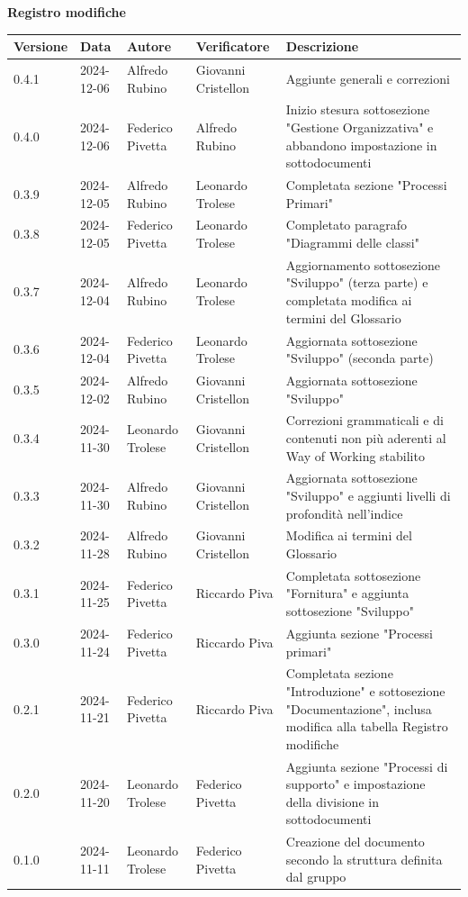 \documentclass[10pt]{article}
\begin{document}
\begin{center}
\textbf{Registro modifiche}\\
\vspace{2mm}

\begin{tabularx}{\textwidth}{|l|l|l|l|X|}
\hline
\textbf{Versione} & \textbf{Data} & \textbf{Autore} & \textbf{Verificatore} & \textbf{Descrizione}\\
    \hline
    0.4.1 & 2024-12-06 & Alfredo Rubino & Giovanni Cristellon & Aggiunte generali e correzioni\\
    \hline
    0.4.0 & 2024-12-06 & Federico Pivetta & Alfredo Rubino & Inizio stesura sottosezione "Gestione Organizzativa" e abbandono impostazione in sottodocumenti\\
    \hline
    0.3.9 & 2024-12-05 & Alfredo Rubino & Leonardo Trolese & Completata sezione "Processi Primari"\\
    \hline
    0.3.8 & 2024-12-05 & Federico Pivetta & Leonardo Trolese & Completato paragrafo "Diagrammi delle classi"\\
    \hline
    0.3.7 & 2024-12-04 & Alfredo Rubino & Leonardo Trolese & Aggiornamento sottosezione "Sviluppo" (terza parte) e completata modifica ai termini del Glossario\\
    \hline
    0.3.6 & 2024-12-04 & Federico Pivetta & Leonardo Trolese & Aggiornata sottosezione "Sviluppo" (seconda parte)\\
    \hline
    0.3.5 & 2024-12-02 & Alfredo Rubino & Giovanni Cristellon & Aggiornata sottosezione "Sviluppo"\\
    \hline
    0.3.4 & 2024-11-30 & Leonardo Trolese & Giovanni Cristellon & Correzioni grammaticali e di contenuti non più aderenti al Way of Working stabilito\\
    \hline
    0.3.3 & 2024-11-30 & Alfredo Rubino & Giovanni Cristellon & Aggiornata sottosezione "Sviluppo" e aggiunti livelli di profondità nell'indice\\
    \hline
    0.3.2 & 2024-11-28 & Alfredo Rubino & Giovanni Cristellon & Modifica ai termini del Glossario\\
    \hline
    0.3.1 & 2024-11-25 & Federico Pivetta & Riccardo Piva & Completata sottosezione "Fornitura" e aggiunta sottosezione "Sviluppo"\\
    \hline
    0.3.0 & 2024-11-24 & Federico Pivetta & Riccardo Piva & Aggiunta sezione "Processi primari"\\
    \hline
     0.2.1 & 2024-11-21 & Federico Pivetta  & Riccardo Piva & Completata sezione "Introduzione" e sottosezione "Documentazione", inclusa modifica alla tabella Registro modifiche\\
    \hline
    0.2.0 & 2024-11-20 & Leonardo Trolese & Federico Pivetta & Aggiunta sezione "Processi di supporto" e impostazione della divisione in sottodocumenti\\
    \hline
    0.1.0 & 2024-11-11 & Leonardo Trolese & Federico Pivetta & Creazione del documento secondo la struttura definita dal gruppo\\
    \hline
\end{tabularx}
\end{center}
\end{document}
